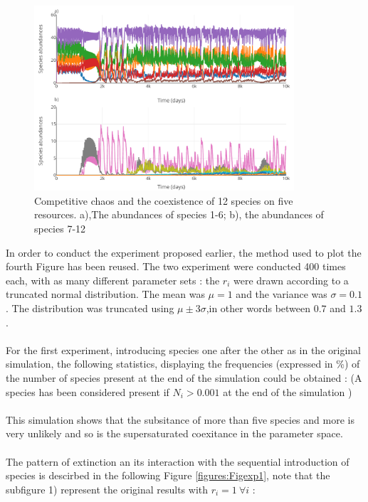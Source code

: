 \begin{figure}[H]
\begin{center} 
 \includegraphics[width=0.86\textwidth]{../Code/Figures/Figure_4.pdf}
  \caption{Competitive chaos and the coexistence of 12 species on five resources. a),The abundances of species 1-6; b), the abundances of species 7-12}
  \label{figures:Fig4}
\end{center}
  \end{figure}
In order to conduct the experiment proposed earlier, the method used to plot the fourth Figure has been reused. The two experiment were conducted 400 times each, with as many different parameter sets : the $r_i$ were drawn according to a truncated normal distribution. The mean was $\mu=1$ and the variance was $\sigma=0.1$. The distribution was truncated using $\mu\pm3\sigma$,in other words between $0.7$ and $1.3$.\\
\\
For the first experiment, introducing species one after the other as in the original simulation, the following statistics, displaying the frequencies (expressed in \%) of the number of species present at the end of the simulation could be obtained : (A species has been considered present if $N_i > 0.001$ at the end of the simulation )\\


\\
This simulation shows that the subsitance of more than five species and more is very unlikely and so is the supersaturated coexitance in the parameter space.\\
\\
The pattern of extinction an its interaction with the sequential introduction of species is descirbed in the following Figure \ref{figures:Figexp1}, note that the subfigure 1) represent the original results with $r_i=1 ~\forall i$ : 
